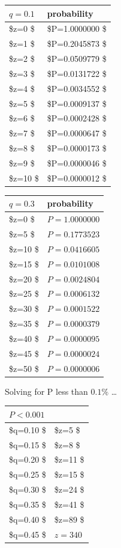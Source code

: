 \documentclass[10pt]{book}
\begin{document}
\begin{center}
\begin{tabular}{ll}
\(q=0.1\) & probability\\
\hline
\$z=0  \$ & \$P=1.0000000 \$\\
\$z=1  \$ & \$P=0.2045873 \$\\
\$z=2  \$ & \$P=0.0509779 \$\\
\$z=3  \$ & \$P=0.0131722 \$\\
\$z=4  \$ & \$P=0.0034552 \$\\
\$z=5  \$ & \$P=0.0009137 \$\\
\$z=6  \$ & \$P=0.0002428 \$\\
\$z=7  \$ & \$P=0.0000647 \$\\
\$z=8  \$ & \$P=0.0000173 \$\\
\$z=9  \$ & \$P=0.0000046 \$\\
\$z=10 \$ & \$P=0.0000012 \$\\
\end{tabular}
\end{center}

\begin{center}
\begin{tabular}{ll}
\(q=0.3\) & probability\\
\hline
\$z=0  \$ & \(P=1.0000000\)\\
\$z=5  \$ & \(P=0.1773523\)\\
\$z=10 \$ & \(P=0.0416605\)\\
\$z=15 \$ & \(P=0.0101008\)\\
\$z=20 \$ & \(P=0.0024804\)\\
\$z=25 \$ & \(P=0.0006132\)\\
\$z=30 \$ & \(P=0.0001522\)\\
\$z=35 \$ & \(P=0.0000379\)\\
\$z=40 \$ & \(P=0.0000095\)\\
\$z=45 \$ & \(P=0.0000024\)\\
\$z=50 \$ & \(P=0.0000006\)\\
\end{tabular}
\end{center}

Solving for P less than \(0.1\%\) \ldots{}

\begin{center}
\begin{tabular}{ll}
\(P < 0.001\) & \\
\hline
\$q=0.10   \$ & \$z=5  \$\\
\$q=0.15   \$ & \$z=8  \$\\
\$q=0.20   \$ & \$z=11 \$\\
\$q=0.25   \$ & \$z=15 \$\\
\$q=0.30   \$ & \$z=24 \$\\
\$q=0.35   \$ & \$z=41 \$\\
\$q=0.40   \$ & \$z=89 \$\\
\$q=0.45   \$ & \(z=340\)\\
\end{tabular}
\end{center}
\end{document}
